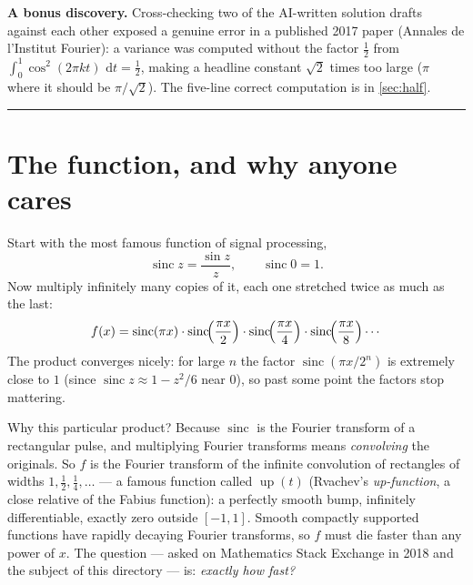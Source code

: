 \documentclass[11pt,oneside]{article}
\theoremstyle{remark}
\newcommand{\dd}{\,\mathrm d}
\newcommand{\sinc}{\operatorname{sinc}}
\newcommand{\Up}{\operatorname{up}}
\begin{document}
\textbf{A bonus discovery.}  Cross-checking two of the AI-written
solution drafts against each other exposed a genuine error in a
published 2017 paper (Annales de l'Institut Fourier): a variance was
computed without the factor $\tfrac12$ from
$\int_0^1\cos^2(2\pi kt)\,\dd t=\tfrac12$, making a headline constant
$\sqrt2$ times too large ($\pi$ where it should be $\pi/\sqrt2$).
The five-line correct computation is in \cref{sec:half}.
\par\vspace{0.9em}\hrule

\tableofcontents

\section{The function, and why anyone cares}

Start with the most famous function of signal processing,
\[
 \sinc z=\frac{\sin z}{z},\qquad\sinc 0=1 .
\]
Now multiply infinitely many copies of it, each one stretched twice as
much as the last:
\[
 f(x)=\sinc(\pi x)\cdot\sinc\!\Bigl(\frac{\pi x}{2}\Bigr)\cdot
 \sinc\!\Bigl(\frac{\pi x}{4}\Bigr)\cdot
 \sinc\!\Bigl(\frac{\pi x}{8}\Bigr)\cdots
\]
The product converges nicely: for large $n$ the factor
$\sinc(\pi x/2^n)$ is extremely close to $1$ (since $\sinc z\approx
1-z^2/6$ near $0$), so past some point the factors stop mattering.

Why this particular product?  Because $\sinc$ is the Fourier transform
of a rectangular pulse, and multiplying Fourier transforms means
\emph{convolving} the originals.  So $f$ is the Fourier transform of
the infinite convolution of rectangles of widths $1,\tfrac12,\tfrac14,
\dots$ --- a famous function called $\Up(t)$ (Rvachev's
\emph{up-function}, a close relative of the Fabius function): a
perfectly smooth bump, infinitely differentiable, exactly zero outside
$[-1,1]$.  Smooth compactly supported functions have rapidly decaying
Fourier transforms, so $f$ must die faster than any power of $x$.  The
question --- asked on Mathematics Stack Exchange in 2018 and the subject
of this directory --- is: \emph{exactly how fast?}
\end{document}
